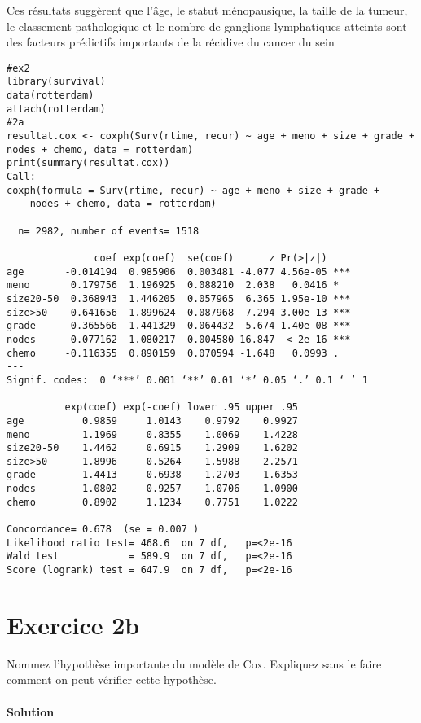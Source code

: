 \documentclass[../main.tex]{subfiles}
\begin{document}
\begin{CJK*}{UTF8}{gbsn}
Ces résultats suggèrent que l'âge, le statut ménopausique, la taille de la tumeur, le classement pathologique et le nombre de ganglions lymphatiques atteints sont des facteurs prédictifs importants de la récidive du cancer du sein

\begin{lstlisting}
#ex2
library(survival)
data(rotterdam)
attach(rotterdam)
#2a
resultat.cox <- coxph(Surv(rtime, recur) ~ age + meno + size + grade + nodes + chemo, data = rotterdam)
print(summary(resultat.cox))
Call:
coxph(formula = Surv(rtime, recur) ~ age + meno + size + grade + 
    nodes + chemo, data = rotterdam)

  n= 2982, number of events= 1518 

               coef exp(coef)  se(coef)      z Pr(>|z|)    
age       -0.014194  0.985906  0.003481 -4.077 4.56e-05 ***
meno       0.179756  1.196925  0.088210  2.038   0.0416 *  
size20-50  0.368943  1.446205  0.057965  6.365 1.95e-10 ***
size>50    0.641656  1.899624  0.087968  7.294 3.00e-13 ***
grade      0.365566  1.441329  0.064432  5.674 1.40e-08 ***
nodes      0.077162  1.080217  0.004580 16.847  < 2e-16 ***
chemo     -0.116355  0.890159  0.070594 -1.648   0.0993 .  
---
Signif. codes:  0 ‘***’ 0.001 ‘**’ 0.01 ‘*’ 0.05 ‘.’ 0.1 ‘ ’ 1

          exp(coef) exp(-coef) lower .95 upper .95
age          0.9859     1.0143    0.9792    0.9927
meno         1.1969     0.8355    1.0069    1.4228
size20-50    1.4462     0.6915    1.2909    1.6202
size>50      1.8996     0.5264    1.5988    2.2571
grade        1.4413     0.6938    1.2703    1.6353
nodes        1.0802     0.9257    1.0706    1.0900
chemo        0.8902     1.1234    0.7751    1.0222

Concordance= 0.678  (se = 0.007 )
Likelihood ratio test= 468.6  on 7 df,   p=<2e-16
Wald test            = 589.9  on 7 df,   p=<2e-16
Score (logrank) test = 647.9  on 7 df,   p=<2e-16

\end{lstlisting}

\section*{Exercice 2b}
Nommez l'hypothèse importante du modèle de Cox. 
Expliquez sans le faire comment on peut vérifier cette hypothèse.

\paragraph{Solution}\


\end{CJK*}
\end{document}
